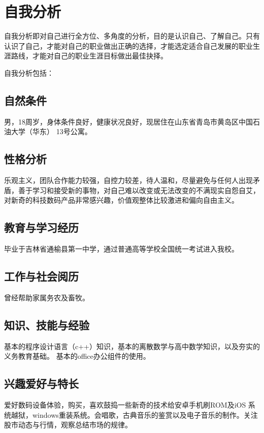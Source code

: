 \documentclass{article}
\begin{document}
\thispagestyle{empty}
\newpage
\setcounter{page}{1}
\section{自我分析}
	自我分析即对自己进行全方位、多角度的分析，目的是认识自己、了解自己。只有认识了自己，才能对自己的职业做出正确的选择，才能选定适合自己发展的职业生涯路线，才能对自己的职业生涯目标做出最佳抉择。\par
	自我分析包括：\par
\subsection{自然条件}
男，18周岁，身体条件良好，健康状况良好，现居住在山东省青岛市黄岛区中国石油大学（华东） 13号公寓。\par
\subsection{性格分析}
乐观主义，团队合作能力较强，自控力较差，待人温和，尽量避免与任何人出现矛盾，善于学习和接受新的事物，对自己难以改变或无法改变的不满现实自怨自艾，对新奇的科技数码产品非常感兴趣，价值观整体比较激进和偏向自由主义。\par
\subsection{教育与学习经历}
毕业于吉林省通榆县第一中学，通过普通高等学校全国统一考试进入我校。\par
\subsection{工作与社会阅历}
曾经帮助家属务农及畜牧。\par
\subsection{知识、技能与经验}
基本的程序设计语言（c++）知识，基本的离散数学与高中数学知识，以及夯实的义务教育基础。
基本的office办公组件的使用。
\par
\subsection{兴趣爱好与特长}
爱好数码设备体验，购买，喜欢鼓捣一些新奇的技术给安卓手机刷ROM及iOS 系统越狱，windows重装系统。会唱歌，古典音乐的鉴赏以及电子音乐的制作。关注股市动态与行情，观察总结市场的规律。\par
\end{document}
